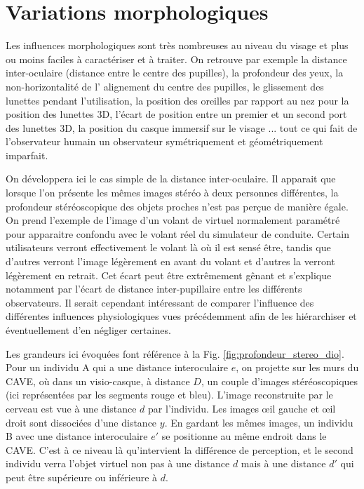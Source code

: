 	\section{Variations morphologiques}
	\par Les influences morphologiques sont très nombreuses au niveau du visage et plus ou moins faciles à caractériser et à traiter. On retrouve par exemple la distance inter-oculaire (distance entre le centre des pupilles), la profondeur des yeux, la non-horizontalité de l' alignement du centre des pupilles, le glissement des lunettes pendant l'utilisation, la position des oreilles par rapport au nez pour la position des lunettes 3D, l'écart de position entre un premier et un second port des lunettes 3D, la position du casque immersif sur le visage ... tout ce qui fait de l'observateur humain un observateur symétriquement et géométriquement imparfait.
	
	\par On développera ici le cas simple de la distance inter-oculaire. Il apparait que lorsque l'on présente les mêmes images stéréo à deux personnes différentes, la profondeur stéréoscopique des objets proches n'est pas perçue de manière égale. On prend l'exemple de l'image d'un volant de virtuel normalement paramétré pour apparaitre confondu avec le volant réel du simulateur de conduite. Certain utilisateurs verront effectivement le volant là où il est sensé être, tandis que d'autres verront l'image légèrement en avant du volant et d'autres la verront légèrement en retrait. Cet écart peut être extrêmement gênant et s'explique notamment par l'écart de distance inter-pupillaire entre les différents observateurs. Il serait cependant intéressant de comparer l'influence des différentes influences physiologiques vues précédemment afin de les hiérarchiser et éventuellement d'en négliger certaines.
	
	\par Les grandeurs ici évoquées font référence à la Fig. \ref{fig:profondeur_stereo_dio}. Pour un individu A qui a une distance interoculaire $e$, on projette sur les murs du CAVE, où dans un visio-casque, à distance $D$, un couple d'images stéréoscopiques (ici représentées par les segments rouge et bleu). L'image reconstruite par le cerveau est vue à une distance $d$ par l'individu. Les images œil gauche et œil droit sont dissociées d'une distance $y$. En gardant les mêmes images, un individu B avec une distance interoculaire $e\prime$ se positionne au même endroit dans le CAVE. C'est à ce niveau là qu'intervient la différence de perception, et le second individu verra l'objet virtuel non pas à une distance $d$ mais à une distance $d\prime$ qui peut être supérieure ou inférieure à $d$.

